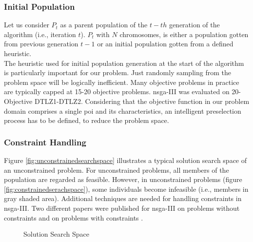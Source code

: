 \subsubsection{Initial Population}
Let us consider $P_t$ as a parent population of the $t-th$ generation of the algorithm (i.e., iteration $t$). $P_t$ with $N$ chromosomes, is either a population gotten from previous generation $t-1$ or an initial population gotten from a defined heuristic.\\ 
The heuristic used for initial population generation at the start of the algorithm is particularly important for our problem. Just randomly sampling from the problem space will be logically inefficient. Many objective problems in practice are typically capped at 15-20 objective problems. \Gls{nsga}-III was evaluated on 20-Objective DTLZ1-DTLZ2. Considering that the objective function in our problem domain comprises a single \gls{poi} and its characteristics, an intelligent preselection process has to be defined, to reduce the problem space.

\subsubsection{Constraint Handling}
Figure \ref{fig:unconstrainedsearchspace} illustrates a typical solution search space of an unconstrained problem. For unconstrained problems, all members of the population are regarded as feasible. However, in unconstrained problems (figure \ref{fig:constrainedserachspace}), some individuals become infeasible (i.e., members in gray shaded area). Additional techniques are needed for handling constraints in \gls{nsga}-III. Two different papers were published for \gls{nsga}-III on problems without constraints \parencite{Deb2013AnConstraints} and on problems with constraints \parencite{Jain2013AnApproach}. 

\begin{figure}[h!]
\centering
{}\qquad
{}
\caption{Solution Search Space}
\label{fig:constrainedvsunconstrained}
\end{figure}

